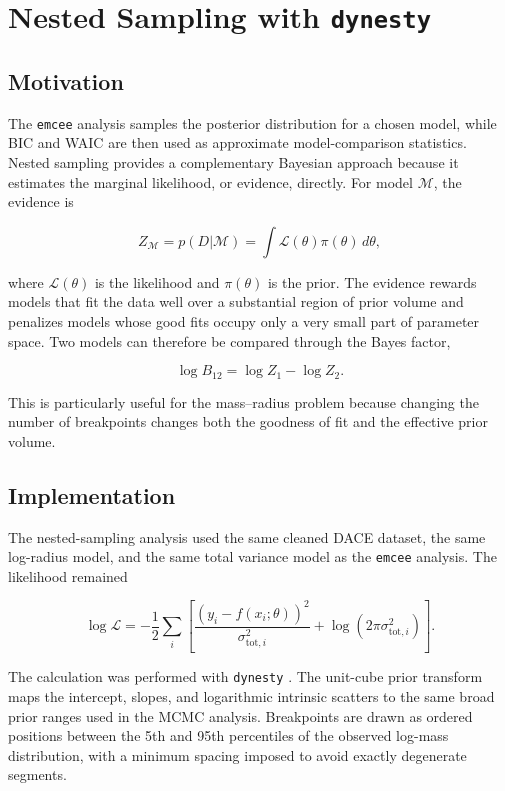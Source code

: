 \documentclass{article}
\numberwithin{equation}{section}
\begin{document}
\section{Nested Sampling with \texttt{dynesty}}

\subsection{Motivation}

The \texttt{emcee} analysis samples the posterior distribution for a chosen model, while BIC and WAIC are then used as approximate model-comparison statistics. Nested sampling provides a complementary Bayesian approach because it estimates the marginal likelihood, or evidence, directly. For model $\mathcal{M}$, the evidence is

\begin{equation}
Z_{\mathcal{M}}
=
p(D|\mathcal{M})
=
\int
\mathcal{L}(\theta)\pi(\theta)\,d\theta,
\end{equation}

where $\mathcal{L}(\theta)$ is the likelihood and $\pi(\theta)$ is the prior. The evidence rewards models that fit the data well over a substantial region of prior volume and penalizes models whose good fits occupy only a very small part of parameter space. Two models can therefore be compared through the Bayes factor,

\begin{equation}
\log B_{12}
=
\log Z_1 - \log Z_2.
\end{equation}

This is particularly useful for the mass--radius problem because changing the number of breakpoints changes both the goodness of fit and the effective prior volume.

\subsection{Implementation}

The nested-sampling analysis used the same cleaned DACE dataset, the same log-radius model, and the same total variance model as the \texttt{emcee} analysis. The likelihood remained

\begin{equation}
\log \mathcal{L}
=
-\frac{1}{2}
\sum_i
\left[
\frac{(y_i-f(x_i;\theta))^2}{\sigma_{\mathrm{tot},i}^2}
+
\log(2\pi \sigma_{\mathrm{tot},i}^2)
\right].
\end{equation}

The calculation was performed with \texttt{dynesty} \cite{speagle2020dynesty}. The unit-cube prior transform maps the intercept, slopes, and logarithmic intrinsic scatters to the same broad prior ranges used in the MCMC analysis. Breakpoints are drawn as ordered positions between the 5th and 95th percentiles of the observed log-mass distribution, with a minimum spacing imposed to avoid exactly degenerate segments.
\end{document}

